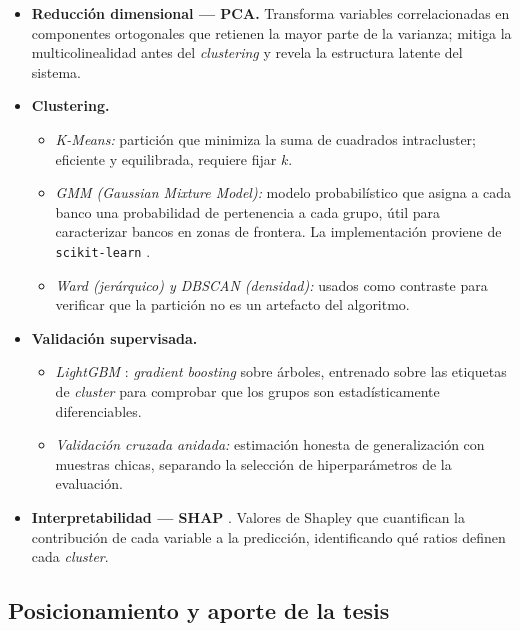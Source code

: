 \documentclass[11pt,a4paper]{article}
\begin{document}
\begin{itemize}
  \item \textbf{Reducción dimensional --- PCA.} Transforma variables correlacionadas en componentes
  ortogonales que retienen la mayor parte de la varianza; mitiga la multicolinealidad antes del
  \textit{clustering} y revela la estructura latente del sistema.
  \item \textbf{Clustering.}
  \begin{itemize}
    \item \textit{K-Means:} partición que minimiza la suma de cuadrados intracluster; eficiente y
    equilibrada, requiere fijar $k$.
    \item \textit{GMM (Gaussian Mixture Model):} modelo probabilístico que asigna a cada banco una
    probabilidad de pertenencia a cada grupo, útil para caracterizar bancos en zonas de
    frontera. La implementación proviene de \texttt{scikit-learn} \citep{scikit-learn}.
    \item \textit{Ward (jerárquico) y DBSCAN (densidad):} usados como contraste para verificar que
    la partición no es un artefacto del algoritmo.
  \end{itemize}
  \item \textbf{Validación supervisada.}
  \begin{itemize}
    \item \textit{LightGBM} \citep{lightgbm}: \textit{gradient boosting} sobre árboles, entrenado
    sobre las etiquetas de \textit{cluster} para comprobar que los grupos son estadísticamente
    diferenciables.
    \item \textit{Validación cruzada anidada:} estimación honesta de generalización con muestras
    chicas, separando la selección de hiperparámetros de la evaluación.
  \end{itemize}
  \item \textbf{Interpretabilidad --- SHAP} \citep{lundberg2017}. Valores de Shapley que cuantifican
  la contribución de cada variable a la predicción, identificando qué ratios definen cada
  \textit{cluster}.
\end{itemize}

\subsection{Posicionamiento y aporte de la tesis}
\end{document}
